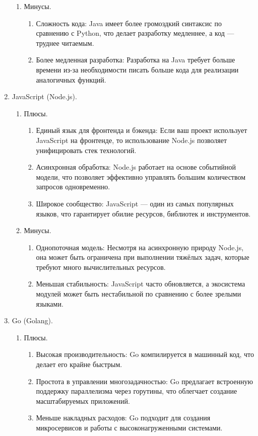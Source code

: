 \begin{enumerate}
\begin{enumerate}
		\item Минусы.
		\begin{enumerate}
			\item Сложность кода: Java имеет более громоздкий синтаксис по сравнению с Python, что делает разработку медленнее, а код — труднее читаемым.
			\item Более медленная разработка: Разработка на Java требует больше времени из-за необходимости писать больше кода для реализации аналогичных функций.
		\end{enumerate}
	\end{enumerate}

	\item JavaScript (Node.js).
	\begin{enumerate}
		\item Плюсы.
		\begin{enumerate}
			\item Единый язык для фронтенда и бэкенда: Если ваш проект использует JavaScript на фронтенде, то использование Node.js позволяет унифицировать стек технологий.
			\item Асинхронная обработка: Node.js работает на основе событийной модели, что позволяет эффективно управлять большим количеством запросов одновременно.
			\item Широкое сообщество: JavaScript — один из самых популярных языков, что гарантирует обилие ресурсов, библиотек и инструментов.
		\end{enumerate}

		\item Минусы.
		\begin{enumerate}
			\item Однопоточная модель: Несмотря на асинхронную природу Node.js, она может быть ограничена при выполнении тяжёлых задач, которые требуют много вычислительных ресурсов.
			\item Меньшая стабильность: JavaScript часто обновляется, а экосистема модулей может быть нестабильной по сравнению с более зрелыми языками.
		\end{enumerate}
	\end{enumerate}

	\item Go (Golang).
	\begin{enumerate}
		\item Плюсы.
		\begin{enumerate}
			\item Высокая производительность: Go компилируется в машинный код, что делает его крайне быстрым.
			\item Простота в управлении многозадачностью: Go предлагает встроенную поддержку параллелизма через горутины, что облегчает создание масштабируемых приложений.
			\item Меньше накладных расходов: Go подходит для создания микросервисов и работы с высоконагруженными системами.
		\end{enumerate}


\end{enumerate}
\end{enumerate}
